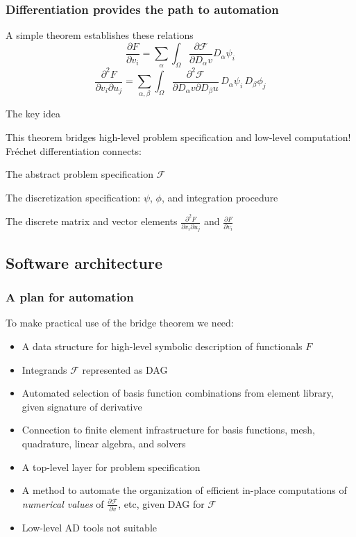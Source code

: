 \documentclass[10pt,xcolor=dvipsnames]{beamer}
\newcommand{\pd}[2]{\frac{\partial #1}{\partial #2}}
\newcommand{\pmix}[3]{\frac{\partial^2 #1}{\partial #2 \partial #3}}
\begin{document}
\frame
{
\frametitle{Differentiation provides the path to automation}
\begin{block}{A simple theorem establishes these relations}
\[
\pd{F}{v_i} =
\sum_\alpha \int_\Omega \pd{\mathcal{F}}{D_\alpha v} D_\alpha \psi_i
\]
\[
\pmix{F}{v_i}{u_j}
= \sum_{\alpha,\beta} \int_\Omega \pmix{\mathcal{F}}{D_\alpha v}{D_\beta u}
\, D_\alpha \psi_i \, D_\beta \phi_j
\]
\end{block}
\begin{alertblock}{\begin{center}The key idea\end{center}}
This theorem bridges high-level problem specification and low-level computation!
Fr\'echet differentiation connects:
\begin{itemize}
{\footnotesize
\item The abstract problem specification $\mathcal{F}$
\item The discretization specification: $\psi$, $\phi$, and integration procedure
\item The discrete matrix and vector elements $\pmix{F}{v_i}{u_j}$ and $\pd{F}{v_i}$
}
\end{itemize}
\end{alertblock}
}


\subsection{Software architecture}

\frame
{
  \frametitle{A plan for automation}

\begin{block}{To make practical use of the bridge theorem we need:}
\begin{itemize}
\item A data structure for high-level symbolic description of functionals $F$
\item Integrands $\mathcal{F}$ represented as DAG
\item Automated selection of basis function combinations from element library,
given signature of derivative
\item Connection to finite element infrastructure for basis functions, mesh, quadrature,
linear algebra, and solvers
\item A top-level layer for problem specification
\item A method to automate the organization of efficient
in-place computations of {\it numerical values} of $\pd{\mathcal{F}}{v}$, etc, given DAG for $\mathcal{F}$
\item Low-level AD tools not suitable
\end{itemize}
\end{block}
}
\end{document}
